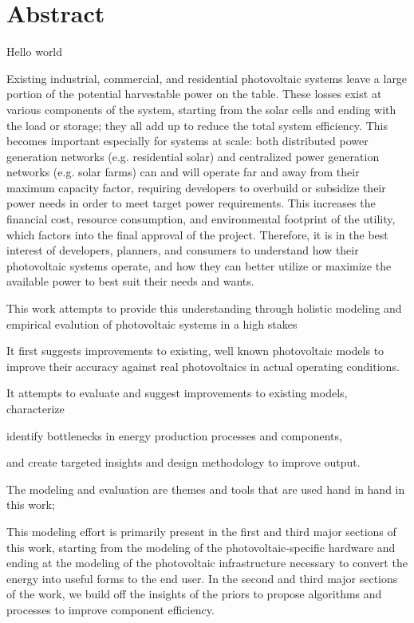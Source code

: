 \chapter*{Abstract}

Hello world

Existing industrial, commercial, and residential photovoltaic systems leave a
large portion of the potential harvestable power on the table. These losses
exist at various components of the system, starting from the solar cells and
ending with the load or storage; they all add up to reduce the total system
efficiency. This becomes important especially for systems at scale: both
distributed power generation networks (e.g. residential solar) and centralized
power generation networks (e.g. solar farms) can and will operate far and away
from their maximum capacity factor, requiring developers to overbuild or
subsidize their power needs in order to meet target power requirements. This
increases the financial cost, resource consumption, and environmental footprint
of the utility, which factors into the final approval of the project. Therefore,
it is in the best interest of developers, planners, and consumers to understand
how their photovoltaic systems operate, and how they can better utilize or
maximize the available power to best suit their needs and wants.

This work attempts to provide this understanding through holistic modeling and
empirical evalution of photovoltaic systems in a high stakes


It first suggests improvements to
existing, well known photovoltaic models to improve their accuracy against real
photovoltaics in actual operating conditions.


It attempts to evaluate and suggest
improvements to existing models, characterize

identify bottlenecks in energy production processes and components,

and create targeted insights and design methodology to improve output.

The modeling and evaluation are themes and tools that are used hand in
hand in this work;


This modeling
effort is primarily present in the first and third major sections of this work,
starting from the modeling of the photovoltaic-specific hardware and ending at
the modeling of the photovoltaic infrastructure necessary to convert the energy
into useful forms to the end user. In the second and third major sections of the
work, we build off the insights of the priors to propose algorithms and
processes to improve component efficiency.



